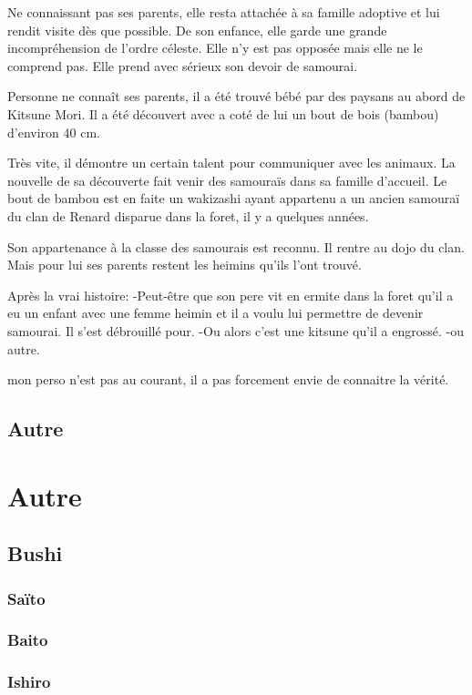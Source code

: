 \documentclass[10pt,a4paper]{book}
\begin{document}
Ne connaissant pas ses parents, elle resta attachée à sa famille adoptive et lui rendit visite dès que possible. De son enfance, elle garde une grande incompréhension de l’ordre céleste. Elle n’y est pas opposée mais elle ne le comprend pas. Elle prend avec sérieux son devoir de samourai. 

Personne ne connaît ses parents, il a été trouvé bébé par des paysans au abord de Kitsune Mori.
Il a été découvert avec a coté de lui un bout de bois (bambou) d'environ 40 cm.

Très vite, il démontre un certain talent pour communiquer avec les animaux. La nouvelle de sa découverte fait venir des samouraïs dans sa famille d'accueil. Le bout de bambou est en faite un wakizashi ayant appartenu a un ancien samouraï du clan de Renard disparue dans la foret, il y a quelques années.

Son appartenance à la classe des samourais est reconnu. Il rentre au dojo du clan. Mais pour lui ses parents restent les heimins qu'ils l'ont trouvé.

Après la vrai histoire:
-Peut-être que son pere vit en ermite dans la foret qu'il a eu un enfant avec une femme heimin et il a voulu lui permettre de devenir samourai. Il s'est débrouillé pour.
-Ou alors c'est une kitsune qu'il a engrossé.
-ou autre.

mon perso n'est pas au courant, il a pas forcement envie de connaitre la vérité. 

\section{Autre}


\chapter{Autre}

\section{Bushi}

\subsection{Saïto}

\subsection{Baito}

\subsection{Ishiro}
\end{document}
